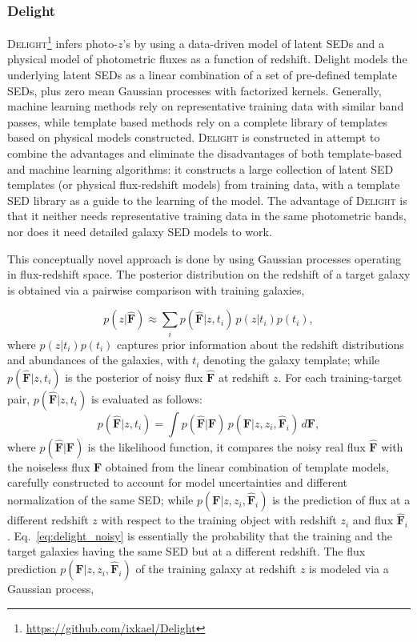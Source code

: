 \subsubsection{Delight}
\label{sec:delight}

\textsc{Delight}\footnote{\url{https://github.com/ixkael/Delight}} \citep{Leistedt:17} infers photo-$z$'s by using a data-driven model of latent SEDs and a physical model of photometric fluxes as a function of redshift.
Delight models the underlying latent SEDs as a linear combination of a set of pre-defined template SEDs, plus zero mean Gaussian processes with factorized kernels.
Generally, machine learning methods rely on representative training data with similar band passes, while template based methods rely on a complete library of templates based on physical models constructed.
\textsc{Delight} is constructed in attempt to combine the advantages and eliminate the disadvantages of both template-based and machine learning algorithms: it constructs a large collection of latent SED templates (or physical flux-redshift models) from training data, with a template SED library as a guide to the learning of the model.
The advantage of \textsc{Delight} is that it neither needs representative training data in the same photometric bands, nor does it need detailed galaxy SED models to work.

This conceptually novel approach is done by using Gaussian processes operating in flux-redshift space.
The posterior distribution on the redshift of a target galaxy is obtained via a pairwise comparison with training galaxies,

\begin{equation}
p(z|\mathbf{\hat{F}}) \approx \sum_i p(\mathbf{\hat{F}}|z,t_i)\, p(z|t_i)p(t_i),
\end{equation}
\noindent where $p(z|t_i)p(t_i)$ captures prior information about the redshift distributions and abundances of the galaxies, with $t_i$ denoting the galaxy template; while $p(\mathbf{\hat{F}}|z,t_i)$ is the posterior of noisy flux $\mathbf{\hat{F}}$ at redshift $z$.
For each training-target pair, $p(\mathbf{\hat{F}}|z,t_i)$ is evaluated as follows:
\begin{equation} \label{eq:delight_noisy}
p(\mathbf{\hat{F}}|z,t_i) = \int p(\mathbf{\hat{F}}|\mathbf{F})\, p(\mathbf{F}|z,z_i,\mathbf{\hat{F}}_i)\, d\mathbf{F},
\end{equation}
where $p(\mathbf{\hat{F}}|\mathbf{F})$ is the likelihood function, it compares the noisy real flux $\mathbf{\hat{F}}$ with the noiseless flux $\mathbf{F}$ obtained from the linear combination of template models, carefully constructed to account for model uncertainties and different normalization of the same SED; while $p(\mathbf{F}|z,z_i,\mathbf{\hat{F}}_i)$ is the prediction of flux at a different redshift $z$ with respect to the training object with redshift $z_i$ and flux $\mathbf{\hat{F}}_i$. Eq.~\ref{eq:delight_noisy} is essentially the probability that the training and the target galaxies having the same SED but at a different redshift.
The flux prediction $p(\mathbf{F}|z,z_i,\mathbf{\hat{F}}_i)$ of the training galaxy at redshift $z$ is modeled via a Gaussian process,

